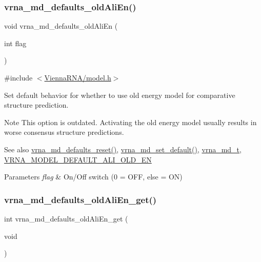 \subsubsection{\texorpdfstring{vrna\_md\_defaults\_oldAliEn()}{vrna\_md\_defaults\_oldAliEn()}}
{\footnotesize\ttfamily void vrna\+\_\+md\+\_\+defaults\+\_\+old\+Ali\+En (\begin{DoxyParamCaption}\item[{int}]{flag }\end{DoxyParamCaption})}



{\ttfamily \#include $<$\mbox{\hyperlink{model_8h}{Vienna\+R\+N\+A/model.\+h}}$>$}



Set default behavior for whether to use old energy model for comparative structure prediction. 

\begin{DoxyNote}{Note}
This option is outdated. Activating the old energy model usually results in worse consensus structure predictions. 
\end{DoxyNote}
\begin{DoxySeeAlso}{See also}
\mbox{\hyperlink{group__model__details_ga70834424cf804d149937de89f80ceb45}{vrna\+\_\+md\+\_\+defaults\+\_\+reset()}}, \mbox{\hyperlink{group__model__details_ga8ac6ff84936282436f822644bf841f66}{vrna\+\_\+md\+\_\+set\+\_\+default()}}, \mbox{\hyperlink{group__model__details_ga1f8a10e12a0a1915f2a4eff0b28ea17c}{vrna\+\_\+md\+\_\+t}}, \mbox{\hyperlink{group__model__details_ga2a5bbfc1edf33077e39466d2d9807115}{V\+R\+N\+A\+\_\+\+M\+O\+D\+E\+L\+\_\+\+D\+E\+F\+A\+U\+L\+T\+\_\+\+A\+L\+I\+\_\+\+O\+L\+D\+\_\+\+EN}} 
\end{DoxySeeAlso}

\begin{DoxyParams}{Parameters}
{\em flag} & On/\+Off switch (0 = O\+FF, else = ON) \\
\hline
\end{DoxyParams}
\mbox{\label{group__model__details_ga2374492b5019df88022fe4c05f0f3630}} 
\subsubsection{\texorpdfstring{vrna\_md\_defaults\_oldAliEn\_get()}{vrna\_md\_defaults\_oldAliEn\_get()}}
{\footnotesize\ttfamily int vrna\+\_\+md\+\_\+defaults\+\_\+old\+Ali\+En\+\_\+get (\begin{DoxyParamCaption}\item[{void}]{ }\end{DoxyParamCaption})}



